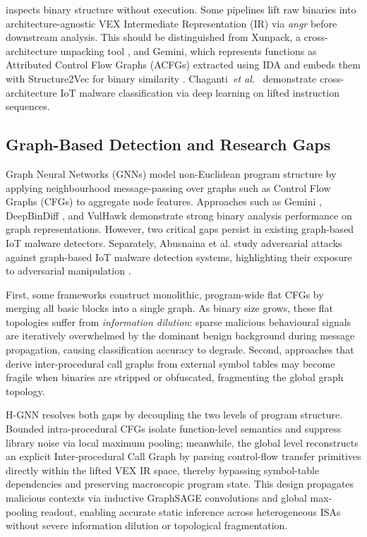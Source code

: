 \documentclass{llncs}
\begin{document}
 inspects binary structure without
execution. Some pipelines lift raw binaries into architecture-agnostic
VEX Intermediate Representation (IR) via \textit{angr} before downstream
analysis.
This should be distinguished from Xunpack, a cross-architecture
unpacking tool \cite{b4}, and Gemini, which represents functions as
Attributed Control Flow Graphs (ACFGs) extracted using IDA and embeds them
with Structure2Vec for binary similarity \cite{b8}.
Chaganti~\textit{et al.}~\cite{b5} demonstrate cross-architecture
IoT malware classification via deep learning on lifted instruction
sequences.

\subsection{Graph-Based Detection and Research Gaps}

Graph Neural Networks (GNNs) model non-Euclidean program
structure by applying neighbourhood message-passing over graphs such as
Control Flow Graphs (CFGs) to aggregate node features.
Approaches such as Gemini \cite{b8}, DeepBinDiff \cite{b9}, and VulHawk
\cite{b10} demonstrate strong binary analysis performance on
graph representations. However, two critical gaps persist
in existing graph-based IoT malware detectors.
Separately, Abusnaina et al. study adversarial attacks against
graph-based IoT malware detection systems, highlighting their exposure to
adversarial manipulation \cite{b6}.

First, some frameworks construct monolithic, program-wide
flat CFGs by merging all basic blocks into a single graph.
As binary size grows, these flat topologies suffer
from \textit{information dilution}: sparse malicious
behavioural signals are iteratively overwhelmed by the
dominant benign background during message propagation, causing
classification accuracy to degrade. Second, approaches that derive
inter-procedural call graphs from external symbol tables may become fragile
when binaries are stripped or obfuscated, fragmenting the global graph
topology.

H-GNN resolves both gaps by decoupling the two levels of program structure. Bounded intra-procedural CFGs isolate 
function-level semantics and suppress library noise via local maximum pooling; 
meanwhile, the global level reconstructs an explicit Inter-procedural Call Graph 
by parsing control-flow transfer primitives directly within the lifted VEX IR space, 
thereby bypassing symbol-table dependencies and preserving macroscopic program state. 
This design propagates malicious contexts via inductive GraphSAGE convolutions and 
global max-pooling readout, enabling accurate static inference 
across heterogeneous ISAs without severe information dilution or topological fragmentation.
\end{document}
